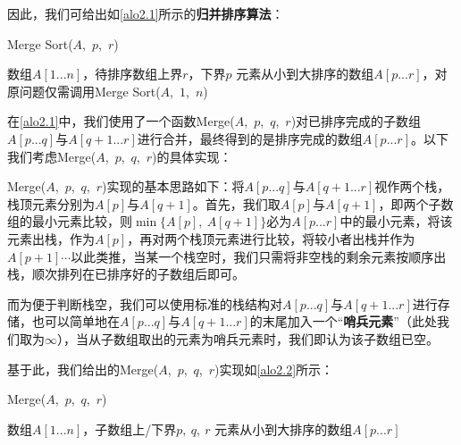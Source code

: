 \documentclass[12pt,a4paper,violet,oneside]{bbe}
\begin{document}
因此，我们可给出如\cref{alo2.1}所示的\textbf{归并排序算法}：
\\
\begin{algorithm}[H]
	\caption{Merge Sort($A$,~$p$,~$r$)}
	\label{alo2.1}
	\begin{algorithmic}[1] 
		\Require 数组$A[1...n]$，待排序数组上界$r$，下界$p$
		\Ensure 元素从小到大排序的数组$A[p...r]$，对原问题仅需调用Merge Sort($A$,~$1$,~$n$) 
		\textcolor{blue}{}
		\textcolor{blue}{}
		\EndIf
	\end{algorithmic} 
\end{algorithm}

在\cref{alo2.1}中，我们使用了一个函数Merge($A$,~$p$,~$q$,~$r$)对已排序完成的子数组$A[p...q]$与$A[q+1...r]$进行合并，最终得到的是排序完成的数组$A[p...r]$。以下我们考虑Merge($A$,~$p$,~$q$,~$r$)的具体实现：

Merge($A$,~$p$,~$q$,~$r$)实现的基本思路如下：将$A[p...q]$与$A[q+1...r]$视作两个栈，栈顶元素分别为$A[p]$与$A[q+1]$。首先，我们取$A[p]$与$A[q+1]$，即两个子数组的最小元素比较，则$\min\{A[p],~A[q+1]\}$必为$A[p...r]$中的最小元素，将该元素出栈，作为$A[p]$，再对两个栈顶元素进行比较，将较小者出栈并作为$A[p+1]$$\cdots$以此类推，当某一个栈空时，我们只需将非空栈的剩余元素按顺序出栈，顺次排列在已排序好的子数组后即可。

而为便于判断栈空，我们可以使用标准的栈结构对$A[p...q]$与$A[q+1...r]$进行存储，也可以简单地在$A[p...q]$与$A[q+1...r]$的末尾加入一个“\textbf{哨兵元素}”（此处我们取为$\infty$），当从子数组取出的元素为哨兵元素时，我们即认为该子数组已空。

基于此，我们给出的Merge($A$,~$p$,~$q$,~$r$)实现如\cref{alo2.2}所示：
\\
\begin{algorithm}[H]
	\caption{Merge($A$,~$p$,~$q$,~$r$)}
	\label{alo2.2}
	\begin{algorithmic}[1] 
		\Require 数组$A[1...n]$，子数组上/下界$p,~q,~r$
		\Ensure 元素从小到大排序的数组$A[p...r]$ 
		\textcolor{blue}{}
		\textcolor{blue}{}
		\EndIf\textcolor{blue}{}
		\EndFor
	\end{algorithmic} 
\end{algorithm}
\end{document}
